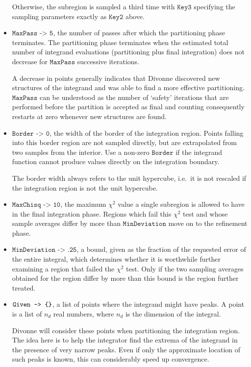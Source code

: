 \documentclass[12pt]{article}
\newcommand\ie{i.e.\ }
\newcommand\lbrac{\symbol{123}}
\newcommand\rbrac{\symbol{125}}
\newcommand\Code[1]{\ensuremath{\texttt{#1}}}
\newcommand\Option[2]{\item\Code{#1 -> #2},}
\begin{document}
\begin{itemize}
Otherwise, the subregion is sampled a third time with \Code{Key3}
specifying the sampling parameters exactly as \Code{Key2} above.

\Option{MaxPass}{5}
the number of passes after which the partitioning phase terminates.
The partitioning phase terminates when the estimated total number of 
integrand evaluations (partitioning plus final integration) does not 
decrease for \Code{MaxPass} successive iterations.

A decrease in points generally indicates that Divonne discovered new
structures of the integrand and was able to find a more effective
partitioning.  \Code{MaxPass} can be understood as the number of
`safety' iterations that are performed before the partition is accepted
as final and counting consequently restarts at zero whenever new
structures are found.

\Option{Border}{0}
the width of the border of the integration region.  Points falling into
this border region are not sampled directly, but are extrapolated from
two samples from the interior.  Use a non-zero \Code{Border} if the
integrand function cannot produce values directly on the integration
boundary.

The border width always refers to the unit hypercube, \ie it is not
rescaled if the integration region is not the unit hypercube.

\Option{MaxChisq}{10}
the maximum $\chi^2$ value a single subregion is allowed to have in the
final integration phase.  Regions which fail this $\chi^2$ test and
whose sample averages differ by more than \Code{MinDeviation} move on
to the refinement phase.

\Option{MinDeviation}{.25}
a bound, given as the fraction of the requested error of the entire
integral, which determines whether it is worthwhile further examining a
region that failed the $\chi^2$ test.  Only if the two sampling averages
obtained for the region differ by more than this bound is the region
further treated.

\Option{Given}{\lbrac\rbrac}
a list of points where the integrand might have peaks.  A point is a
list of $n_d$ real numbers, where $n_d$ is the dimension of the
integral.

Divonne will consider these points when partitioning the integration
region.  The idea here is to help the integrator find the extrema of the
integrand in the presence of very narrow peaks.  Even if only the
approximate location of such peaks is known, this can considerably speed
up convergence.


\end{itemize}
\end{document}
